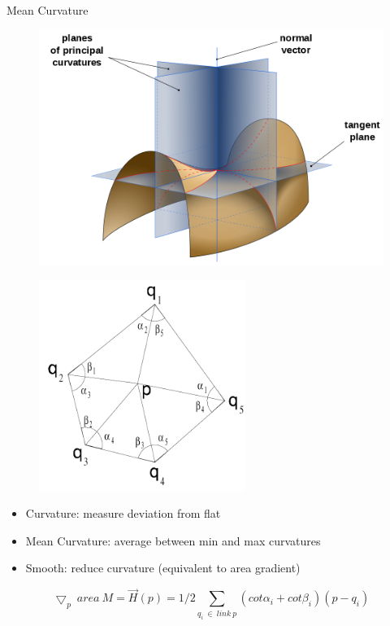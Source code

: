 \documentclass{beamer}
\begin{document}
\begin{frame}{Mean Curvature}
\begin{figure}[htbp]
  \begin{minipage}[b]{0.4\linewidth}
    \centering
    \includegraphics[width=\textwidth]{principal_curvature.png}
    \label{fig:curvature}
  \end{minipage}
  \hspace{0.5cm}
  \begin{minipage}[b]{0.4\linewidth}
    \centering
    \includegraphics[width=0.6\textwidth]{cotangent.png}
    \label{fig:cotangent}
  \end{minipage}
\end{figure}
\begin{itemize}
	\item Curvature: measure deviation from flat
	\item Mean Curvature: average between min and max curvatures
	\item Smooth: reduce curvature (equivalent to area gradient)
\end{itemize}
\begin{equation*}
\bigtriangledown_p\ area\ M = \vec{H}(p) = 1/2\sum\limits_{q_i\ \in\ link\ p}{(cot\alpha_{i} + cot\beta_{i})(p-q_i)}
\end{equation*}
\end{frame}
\end{document}
